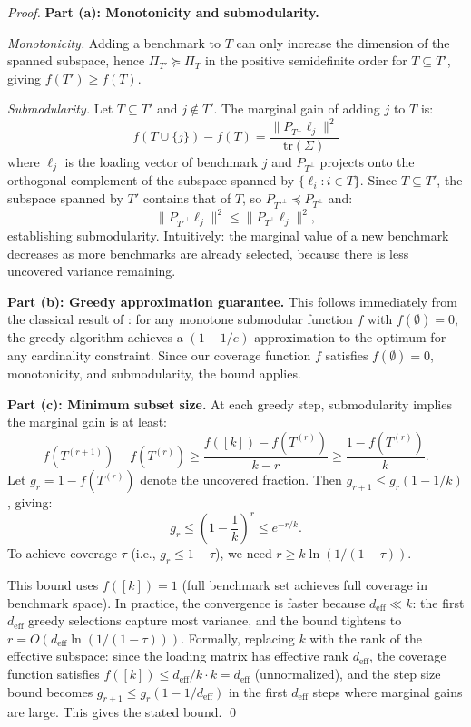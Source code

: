 \begin{proof}
\textbf{Part (a): Monotonicity and submodularity.}

\emph{Monotonicity.} Adding a benchmark to $T$ can only increase the dimension of the spanned subspace, hence $\Pi_{T'} \succeq \Pi_T$ in the positive semidefinite order for $T \subseteq T'$, giving $f(T') \geq f(T)$.

\emph{Submodularity.} Let $T \subseteq T'$ and $j \notin T'$. The marginal gain of adding $j$ to $T$ is:
\[
  f(T \cup \{j\}) - f(T) = \frac{\|P_{T^\perp} \ell_j\|^2}{\mathrm{tr}(\Sigma)}
\]
where $\ell_j$ is the loading vector of benchmark $j$ and $P_{T^\perp}$ projects onto the orthogonal complement of the subspace spanned by $\{\ell_i : i \in T\}$. Since $T \subseteq T'$, the subspace spanned by $T'$ contains that of $T$, so $P_{T'^\perp} \preceq P_{T^\perp}$ and:
\[
  \|P_{T'^\perp} \ell_j\|^2 \leq \|P_{T^\perp} \ell_j\|^2,
\]
establishing submodularity. Intuitively: the marginal value of a new benchmark decreases as more benchmarks are already selected, because there is less uncovered variance remaining.

\textbf{Part (b): Greedy approximation guarantee.} This follows immediately from the classical result of \citet{nemhauser1978analysis}: for any monotone submodular function $f$ with $f(\emptyset) = 0$, the greedy algorithm achieves a $(1 - 1/e)$-approximation to the optimum for any cardinality constraint. Since our coverage function $f$ satisfies $f(\emptyset) = 0$, monotonicity, and submodularity, the bound applies.

\textbf{Part (c): Minimum subset size.} At each greedy step, submodularity implies the marginal gain is at least:
\[
  f(T^{(r+1)}) - f(T^{(r)}) \geq \frac{f([k]) - f(T^{(r)})}{k - r} \geq \frac{1 - f(T^{(r)})}{k}.
\]
Let $g_r = 1 - f(T^{(r)})$ denote the uncovered fraction. Then $g_{r+1} \leq g_r(1 - 1/k)$, giving:
\[
  g_r \leq \left(1 - \frac{1}{k}\right)^r \leq e^{-r/k}.
\]
To achieve coverage $\tau$ (i.e., $g_r \leq 1 - \tau$), we need $r \geq k \ln(1/(1-\tau))$.

This bound uses $f([k]) = 1$ (full benchmark set achieves full coverage in benchmark space). In practice, the convergence is faster because $d_{\mathrm{eff}} \ll k$: the first $d_{\mathrm{eff}}$ greedy selections capture most variance, and the bound tightens to $r = O(d_{\mathrm{eff}} \ln(1/(1-\tau)))$. Formally, replacing $k$ with the rank of the effective subspace: since the loading matrix has effective rank $d_{\mathrm{eff}}$, the coverage function satisfies $f([k]) \leq d_{\mathrm{eff}} / k \cdot k = d_{\mathrm{eff}}$ (unnormalized), and the step size bound becomes $g_{r+1} \leq g_r(1 - 1/d_{\mathrm{eff}})$ in the first $d_{\mathrm{eff}}$ steps where marginal gains are large. This gives the stated bound. \qed
\end{proof}

